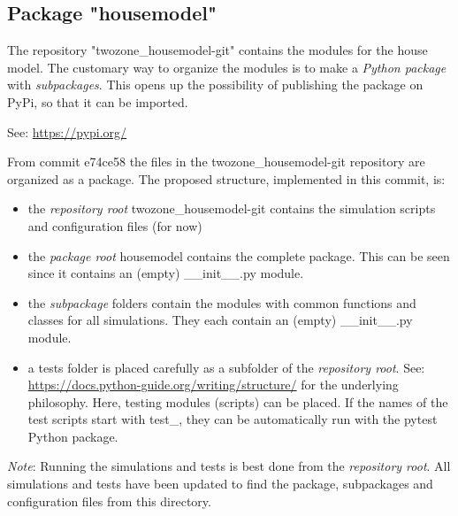 \subsection{Package "housemodel"}

The repository "\textsf{twozone\_housemodel-git}" contains the modules for the house model. The customary way to organize the modules is to make a \emph{Python package} with \emph{subpackages}. This opens up the possibility of publishing the package on PyPi, so that it can be imported.

See: \url{https://pypi.org/}

From commit \textsf{e74ce58} the files in the \textsf{twozone\_housemodel-git} repository are organized as a package. The proposed structure, implemented in this commit, is:


\begin{itemize}
	\item the \emph{repository root} \textsf{twozone\_housemodel-git} contains the simulation scripts and configuration files (for now) 
	\item the \emph{package root} \textsf{housemodel} contains the complete package. This can be seen since it contains an (empty) \textsf{\_\_init\_\_.py} module.
	\item the \emph{subpackage} folders contain the modules with common functions and classes for all simulations. They each contain an (empty) \textsf{\_\_init\_\_.py} module.
	\item a \textsf{tests} folder is placed carefully as a subfolder of the \emph{repository root}. 
	See: \url{https://docs.python-guide.org/writing/structure/} for the underlying philosophy. Here, testing modules (scripts) can be placed. If the names of the test scripts start with \textsf{test\_}, they can be automatically run with the \textsf{pytest} Python package.
\end{itemize}

\textit{Note}: Running the simulations and tests is best done from the \emph{repository root}. All simulations and tests have been updated to find the package, subpackages and configuration files from this directory.

\newpage